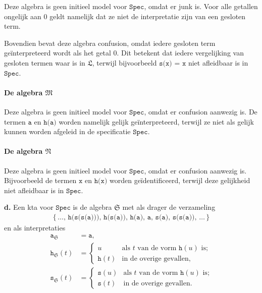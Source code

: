 \documentclass[a4paper,11pt]{article}
\begin{document}
\begin{description}
Deze algebra is geen initieel model voor $\texttt{Spec}$, omdat er junk
is. Voor alle getallen ongelijk aan 0 geldt namelijk dat ze niet de
interpretatie zijn van een gesloten term.

Bovendien bevat deze algebra confusion, omdat iedere gesloten term
ge\"interpreteerd wordt als het getal 0. Dit betekent dat iedere vergelijking
van gesloten termen waar is in $\mathfrak{L}$, terwijl bijvoorbeeld
$\texttt{s(x) = x}$ niet afleidbaar is in $\texttt{Spec}$.

\paragraph{De algebra $\mathfrak{M}$}

Deze algebra is geen initieel model voor $\texttt{Spec}$, omdat er confusion
aanwezig is. De termen $\texttt{a}$ en $\texttt{h(a)}$ worden namelijk gelijk
ge\"interpreteerd, terwijl ze niet als gelijk kunnen worden afgeleid in de
specificatie $\texttt{Spec}$.

\paragraph{De algebra $\mathfrak{N}$}

Deze algebra is geen initieel model voor $\texttt{Spec}$, omdat er
confusion aanwezig is. Bijvoorbeeld de termen $\texttt{x}$ en $\texttt{h(x)}$
worden ge\"identificeerd, terwijl deze gelijkheid niet afleidbaar is in
$\texttt{Spec}$.

\item{\bf d.}
Een kta voor $\texttt{Spec}$ is de algebra $\mathfrak{S}$ met als drager de
verzameling
\begin{align*}
\{\, \ldots, \, \texttt{h(s(s(a)))}, \, \texttt{h(s(a))}, \, \texttt{h(a)}, \, \texttt{a}, \, \texttt{s(a)}, \, \texttt{s(s(a))}, \, \ldots \, \}
\end{align*}
en als interpretaties
\begin{align*}
\texttt{a}_{\mathfrak{S}}    &= \texttt{a}, \\
\texttt{h}_{\mathfrak{S}}(t) &= \begin{cases}
  u             & \text{als $t$ van de vorm $\texttt{h}(u)$ is;} \\
  \texttt{h}(t) & \text{in de overige gevallen,}
\end{cases} \\
\texttt{s}_{\mathfrak{S}}(t) &= \begin{cases}
  \texttt{s}(u) & \text{als $t$ van de vorm $\texttt{h}(u)$ is;} \\
  \texttt{s}(t) & \text{in de overige gevallen.}
\end{cases}
\end{align*}

\end{description}
\end{document}
